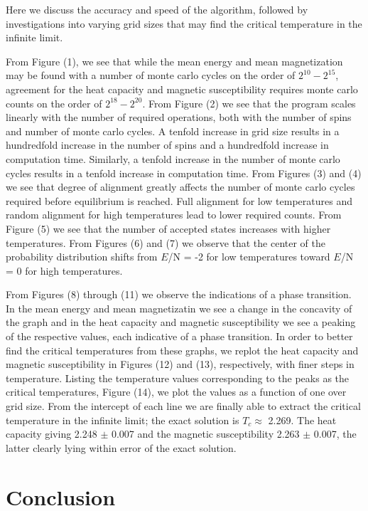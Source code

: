 \documentclass[11pt,a4paper]{article}
\begin{document}
Here we discuss the accuracy and speed of the algorithm, followed by investigations into varying grid sizes that may find the critical temperature in the infinite limit.

From Figure (1), we see that while the mean energy and mean magnetization may be found with a number of monte carlo cycles on the order of $2^{10} - 2^{15}$, agreement for the heat capacity and magnetic susceptibility requires monte carlo counts on the order of $2^{18} - 2^{20}$. From Figure (2) we see that the program scales linearly with the number of required operations, both with the number of spins and number of monte carlo cycles. A tenfold increase in grid size results in a hundredfold increase in the number of spins and a hundredfold increase in computation time. Similarly, a tenfold increase in the number of monte carlo cycles results in a tenfold increase in computation time. From Figures (3) and (4) we see that degree of alignment greatly affects the number of monte carlo cycles required before equilibrium is reached. Full alignment for low temperatures and random alignment for high temperatures lead to lower required counts. From Figure (5) we see that the number of accepted states increases with higher temperatures. From Figures (6) and (7) we observe that the center of the probability distribution shifts from $E$/N = -2 for low temperatures toward $E$/N = 0 for high temperatures.

From Figures (8) through (11) we observe the indications of a phase transition. In the mean energy and mean magnetizatin we see a change in the concavity of the graph and in the heat capacity and magnetic susceptibility we see a peaking of the respective values, each indicative of a phase transition. In order to better find the critical temperatures from these graphs, we replot the heat capacity and magnetic susceptibility in Figures (12) and (13), respectively, with finer steps in temperature. Listing the temperature values corresponding to the peaks as the critical temperatures, Figure (14), we plot the values as a function of one over grid size. From the intercept of each line we are finally able to extract the critical temperature in the infinite limit; the exact solution is $T_c \approx$ 2.269. The heat capacity giving 2.248 $\pm$ 0.007 and the magnetic susceptibility 2.263 $\pm$ 0.007, the latter clearly lying within error of the exact solution. 

\section{Conclusion}
\end{document}
